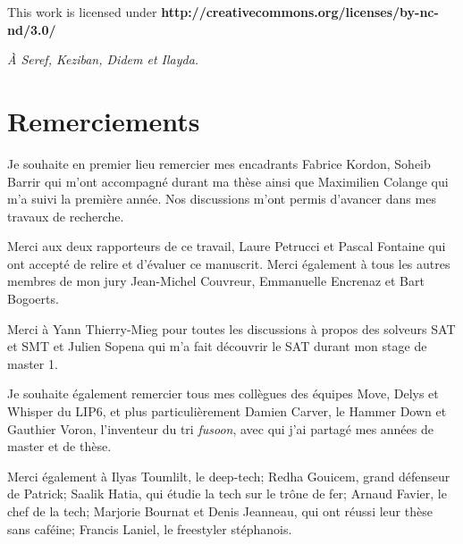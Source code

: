 \clearpage\null\vfill
\thispagestyle{empty}
\begin{minipage}[b]{.9\textwidth}
  \begin{center}
  \setlength{\parskip}{.5\baselineskip}
  {\color{phdcol0}%
   \ccLogo\hspace{.1cm}%
   \ccAttribution\hspace{.1cm}%
   \ccNonCommercial\hspace{.1cm}%
   \ccNoDerivatives}\hspace{.15cm}%
  \footnotesize%
  This work is licensed under {\color{phdcol1}\textbf{http://creativecommons.org/licenses/by-nc-nd/3.0/}}
  \end{center}
\end{minipage}
\vspace*{2\baselineskip}
\clearpage
\thispagestyle{empty}
\begin{flushright}
  \textit{À Seref, Keziban, Didem et Ilayda.}
\end{flushright}
%

\chapter*{Remerciements}

Je souhaite en premier lieu remercier mes encadrants Fabrice Kordon, 
Soheib Barrir qui m'ont accompagné durant ma thèse ainsi que Maximilien Colange
qui m'a suivi la première année.
Nos discussions m'ont permis d'avancer dans mes travaux de recherche.

Merci aux deux rapporteurs de ce travail, 
Laure Petrucci et Pascal Fontaine qui ont accepté de relire et d'évaluer ce manuscrit. Merci également à 
tous les autres membres de mon jury Jean-Michel Couvreur, Emmanuelle Encrenaz et Bart Bogoerts.


Merci à Yann Thierry-Mieg pour toutes les discussions à propos des solveurs SAT et SMT et 
Julien Sopena  qui m'a fait découvrir le SAT durant mon stage de master 1.


Je souhaite également remercier tous mes collègues des équipes Move, Delys et Whisper du LIP6,
et plus particulièrement Damien Carver, le Hammer Down 
et Gauthier Voron, l'inventeur du tri \emph{fusoon}, avec qui j'ai partagé mes années de master et de thèse.


Merci également à Ilyas Toumlilt, le deep-tech;
Redha Gouicem, grand défenseur de Patrick;
Saalik Hatia, qui étudie la tech sur le trône de fer;
Arnaud Favier, le chef de la tech;
Marjorie Bournat et Denis Jeanneau, qui ont réussi leur thèse sans caféine;
Francis Laniel, le freestyler stéphanois.


